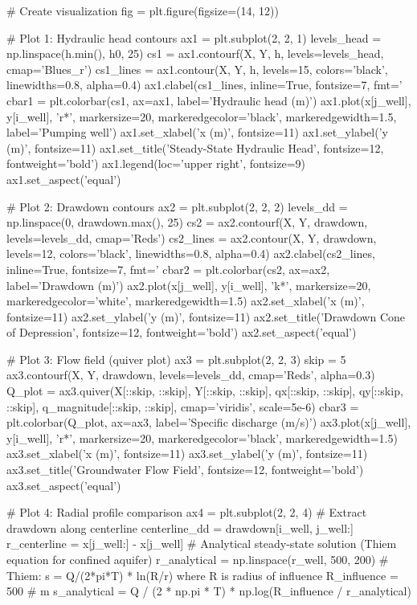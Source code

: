 \documentclass[a4paper, 11pt]{article}
\begin{document}
\begin{pycode}
# Create visualization
fig = plt.figure(figsize=(14, 12))

# Plot 1: Hydraulic head contours
ax1 = plt.subplot(2, 2, 1)
levels_head = np.linspace(h.min(), h0, 25)
cs1 = ax1.contourf(X, Y, h, levels=levels_head, cmap='Blues_r')
cs1_lines = ax1.contour(X, Y, h, levels=15, colors='black', linewidths=0.8, alpha=0.4)
ax1.clabel(cs1_lines, inline=True, fontsize=7, fmt='%
cbar1 = plt.colorbar(cs1, ax=ax1, label='Hydraulic head (m)')
ax1.plot(x[j_well], y[i_well], 'r*', markersize=20, markeredgecolor='black', markeredgewidth=1.5,
         label='Pumping well')
ax1.set_xlabel('x (m)', fontsize=11)
ax1.set_ylabel('y (m)', fontsize=11)
ax1.set_title('Steady-State Hydraulic Head', fontsize=12, fontweight='bold')
ax1.legend(loc='upper right', fontsize=9)
ax1.set_aspect('equal')

# Plot 2: Drawdown contours
ax2 = plt.subplot(2, 2, 2)
levels_dd = np.linspace(0, drawdown.max(), 25)
cs2 = ax2.contourf(X, Y, drawdown, levels=levels_dd, cmap='Reds')
cs2_lines = ax2.contour(X, Y, drawdown, levels=12, colors='black', linewidths=0.8, alpha=0.4)
ax2.clabel(cs2_lines, inline=True, fontsize=7, fmt='%
cbar2 = plt.colorbar(cs2, ax=ax2, label='Drawdown (m)')
ax2.plot(x[j_well], y[i_well], 'k*', markersize=20, markeredgecolor='white', markeredgewidth=1.5)
ax2.set_xlabel('x (m)', fontsize=11)
ax2.set_ylabel('y (m)', fontsize=11)
ax2.set_title('Drawdown Cone of Depression', fontsize=12, fontweight='bold')
ax2.set_aspect('equal')

# Plot 3: Flow field (quiver plot)
ax3 = plt.subplot(2, 2, 3)
skip = 5
ax3.contourf(X, Y, drawdown, levels=levels_dd, cmap='Reds', alpha=0.3)
Q_plot = ax3.quiver(X[::skip, ::skip], Y[::skip, ::skip],
                     qx[::skip, ::skip], qy[::skip, ::skip],
                     q_magnitude[::skip, ::skip], cmap='viridis', scale=5e-6)
cbar3 = plt.colorbar(Q_plot, ax=ax3, label='Specific discharge (m/s)')
ax3.plot(x[j_well], y[i_well], 'r*', markersize=20, markeredgecolor='black', markeredgewidth=1.5)
ax3.set_xlabel('x (m)', fontsize=11)
ax3.set_ylabel('y (m)', fontsize=11)
ax3.set_title('Groundwater Flow Field', fontsize=12, fontweight='bold')
ax3.set_aspect('equal')

# Plot 4: Radial profile comparison
ax4 = plt.subplot(2, 2, 4)
# Extract drawdown along centerline
centerline_dd = drawdown[i_well, j_well:]
r_centerline = x[j_well:] - x[j_well]
# Analytical steady-state solution (Thiem equation for confined aquifer)
r_analytical = np.linspace(r_well, 500, 200)
# Thiem: s = Q/(2*pi*T) * ln(R/r) where R is radius of influence
R_influence = 500  # m
s_analytical = Q / (2 * np.pi * T) * np.log(R_influence / r_analytical)


\end{pycode}
\end{document}
